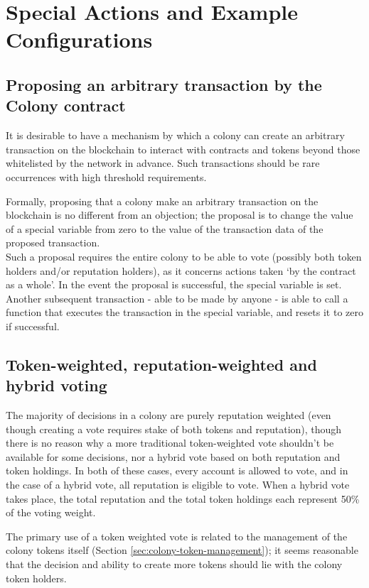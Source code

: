 

\section{Special Actions and Example Configurations}\label{sec:special-cases}

\subsection{Proposing an arbitrary transaction by the Colony contract}\label{sec:arbitrary-transaction}
It is desirable to have a mechanism by which a colony can create an arbitrary transaction on the blockchain to interact with contracts and tokens beyond those whitelisted by the network in advance. Such transactions should be rare occurrences with high threshold requirements.

Formally, proposing that a colony make an arbitrary transaction on the blockchain is no different from an objection; the proposal is to change the value of a special variable from zero to the value of the transaction data of the proposed transaction.\\
Such a proposal requires the entire colony to be able to vote (possibly both token holders and/or reputation holders), as it concerns actions taken `by the contract as a whole'. In the event the proposal is successful, the special variable is set. Another subsequent transaction - able to be made by anyone - is able to call a function that executes the transaction in the special variable, and resets it to zero if successful.

\subsection{Token-weighted, reputation-weighted and hybrid voting}
The majority of decisions in a colony are purely reputation weighted (even though creating a vote requires stake of both tokens and reputation), though there is no reason why a more traditional token-weighted vote shouldn't be available for some decisions, nor a hybrid vote based on both reputation and token holdings. In both of these cases, every account is allowed to vote, and in the case of a hybrid vote, all reputation is eligible to vote. When a hybrid vote takes place, the total reputation and the total token holdings each represent 50\% of the voting weight.

The primary use of a token weighted vote is related to the management of the colony tokens itself (Section \ref{sec:colony-token-management}); it seems reasonable that the decision and ability to create more tokens should lie with the colony token holders.

